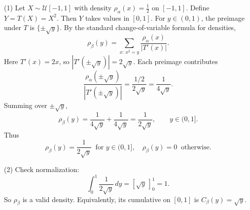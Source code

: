 \documentclass[11pt,a4paper]{article}
\theoremstyle{exostyle}
\newcommand{\Unif}{\mathcal U}
\begin{document}
\begin{solution}
(1) Let $X\sim\Unif[-1,1]$ with density $\rho_\alpha(x)=\tfrac12$ on $[-1,1]$.
Define $Y=T(X)=X^2$. Then $Y$ takes values in $[0,1]$.
For $y\in(0,1)$, the preimage under $T$ is $\{\pm \sqrt{y}\}$. By the standard change-of-variable formula for densities,
\[
\rho_\beta(y)=\sum_{x:\,x^2=y} \frac{\rho_\alpha(x)}{|T'(x)|}.
\]
Here $T'(x)=2x$, so $|T'(\pm\sqrt y)|=2\sqrt y$. Each preimage contributes
\[
\frac{\rho_\alpha(\pm\sqrt y)}{|T'(\pm\sqrt y)|}=\frac{1/2}{2\sqrt y}=\frac{1}{4\sqrt y}.
\]
Summing over $\pm\sqrt y$,
\[
\rho_\beta(y)=\frac{1}{4\sqrt y}+\frac{1}{4\sqrt y}=\frac{1}{2\sqrt y},\qquad y\in(0,1].
\]
Thus
\[
\boxed{\;\rho_\beta(y)=\frac{1}{2\sqrt y}\ \text{ for } y\in(0,1],\quad \rho_\beta(y)=0\ \text{ otherwise.}\;}
\]

(2) Check normalization:
\[
\int_0^1 \frac{1}{2\sqrt y}\,dy
=\left[ \sqrt y \,\right]_{0}^1
=1.
\]
So $\rho_\beta$ is a valid density. Equivalently, its cumulative on $[0,1]$ is $C_\beta(y)=\sqrt y$.


\end{solution}
\end{document}
